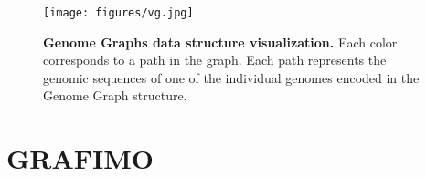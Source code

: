 \documentclass[a4paper, titlepage, openright]{book}
\begin{document}
\begin{figure}
	\centering
	\texttt{[image: figures/vg.jpg]}
	\caption[Genome Graphs data structure visualization]{\textbf{Genome Graphs data structure visualization.}  Each color corresponds to a path in the graph. Each path represents the genomic sequences of one of the individual genomes encoded in the Genome Graph structure.}
	\label{fig:vg}
\end{figure} 
\section{GRAFIMO}
\end{document}
